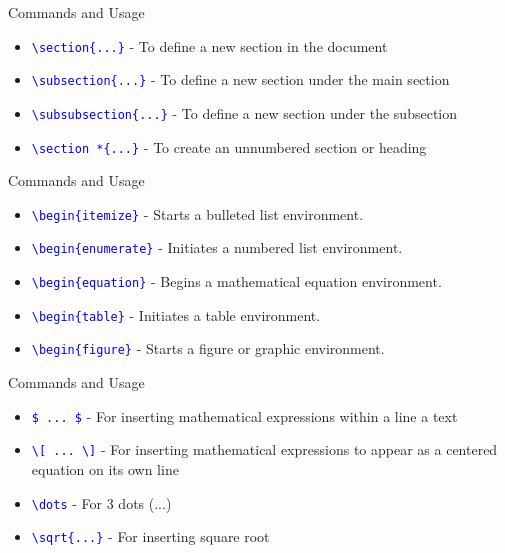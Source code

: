\documentclass{beamer}
\begin{document}
	\begin{frame}{ Commands and Usage}
		\begin{itemize}
			\item \texttt{\textcolor{blue}{\textbackslash section\{...\}}} - To define a new section in the document
			\item \texttt{\textcolor{blue}{\textbackslash subsection\{...\}}} - To define a new section under the main section
			\item \texttt{\textcolor{blue}{\textbackslash subsubsection\{...\}}} - To define a new section under the subsection
			\item \texttt{\textcolor{blue}{\textbackslash section *\{...\}}} - To create an unnumbered section or heading
		\end{itemize}
		
	\end{frame}
	
	\begin{frame}{Commands and Usage}
		
		\begin{itemize}
			\item \texttt{\textcolor{blue}{\textbackslash begin\{itemize\}}} - Starts a bulleted list environment.
			\item \texttt{\textcolor{blue}{\textbackslash begin\{enumerate\}}} - Initiates a numbered list environment.
			\item \texttt{\textcolor{blue}{\textbackslash begin\{equation\}}} - Begins a mathematical equation environment.
			\item \texttt{\textcolor{blue}{\textbackslash begin\{table\}}} - Initiates a table environment.
			\item \texttt{\textcolor{blue}{\textbackslash begin\{figure\}}} - Starts a figure or graphic environment.
		\end{itemize}
		
	\end{frame}

	\begin{frame}{Commands and Usage}
		
		\begin{itemize}
			\item \texttt{\textcolor{blue}{\$ ... \$}} - For inserting mathematical expressions within a line a text \\ [10pt]
			\item \texttt{\textcolor{blue}{\textbackslash[ ... \textbackslash]}} - For inserting mathematical expressions to appear as a centered equation on its own line
			\item \texttt{\textcolor{blue}{\textbackslash dots}} - For 3 dots (...)
			\item \texttt{\textcolor{blue}{\textbackslash sqrt\{...\}}} - For inserting square root
		\end{itemize}
		
	\end{frame}
	
	
\end{document}

